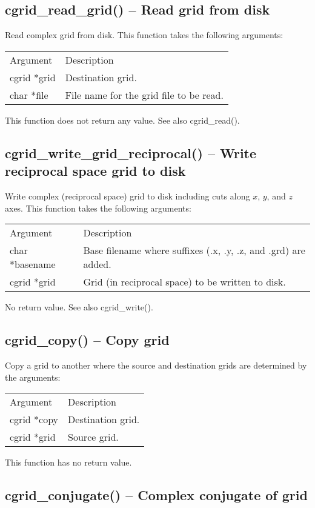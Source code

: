 \documentclass[12pt,letterpaper]{report}
\begin{document}
\subsection{cgrid\_read\_grid() -- Read grid from disk}

Read complex grid from disk. This function takes the following arguments:
\begin{longtable}{p{} p{}}
Argument & Description\\
\cline{1-2}
cgrid *grid & Destination grid.\\
char *file & File name for the grid file to be read.\\
\end{longtable}
\noindent
This function does not return any value. See also cgrid\_read().

\subsection{cgrid\_write\_grid\_reciprocal() -- Write reciprocal space grid to disk}

Write complex (reciprocal space) grid to disk including cuts along $x$, $y$, and $z$ axes. This function takes the following arguments:
\begin{longtable}{p{} p{}}
Argument & Description\\
\cline{1-2}
char *basename & Base filename where suffixes (.x, .y, .z, and .grd) are added.\\
cgrid *grid & Grid (in reciprocal space) to be written to disk.\\
\end{longtable}
\noindent
No return value. See also cgrid\_write().

\subsection{cgrid\_copy() -- Copy grid}

Copy a grid to another where the source and destination grids are determined by the arguments:
\begin{longtable}{p{} p{}}
Argument & Description\\
\cline{1-2}
cgrid *copy & Destination grid.\\
cgrid *grid & Source grid.\\
\end{longtable}
\noindent
This function has no return value.

\subsection{cgrid\_conjugate() -- Complex conjugate of grid}
\end{document}
